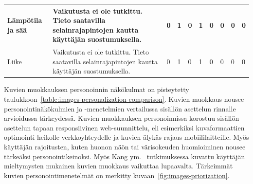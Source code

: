 \documentclass[finnish, 12pt, a4paper, elec, utf8, a-1b]{aaltothesis}
\begin{document}
{\begin{longtable}{p{2.5cm}|p{6cm}|p{0.5cm}p{0.5cm}p{0.5cm}|p{0.5cm}|p{0.5cm}p{0.5cm}p{0.5cm}|p{0.5cm}|}
    \midrule
    Lämpötila ja sää                       & Vaikutusta ei ole tutkittu. Tieto saatavilla selainrajapintojen kautta käyttäjän suostumuksella.                                                                                                                                                                                                                                                                      & 0                                          & 1                                   & 0                                      & 1                            & 0                                               & 0                                         & 0                                         & 0                            \\
    \midrule
    Liike                                  & Vaikutusta ei ole tutkittu. Tieto saatavilla selainrajapintojen kautta käyttäjän suostumuksella.                                                                                                                                                                                                                                                                      & 0                                          & 1                                   & 0                                      & 1                            & 0                                               & 0                                         & 0                                         & 0                            \\
\end{longtable}
}

Kuvien muokkauksen personoinnin näkökulmat on pisteytetty
taulukkoon~\ref{table:images-personalization-comparison}. Kuvien muokkaus nousee
personointinäkökulmien ja -menetelmien vertailussa sisällön asettelun rinnalle
arvioidussa tärkeydessä. Kuvien muokkauksen personoinnissa korostuu sisällön
asettelun tapaan responsiivinen web-suunnittelu, eli esimerkiksi kuvaformaattien
optimointi heikolle verkkoyhteydelle ja kuvien älykäs rajaus mobiililaitteille.
Myös käyttäjän rajoitusten, kuten huonon näön tai värisokeuden huomioiminen
nousee tärkeäksi personointikeinoksi. Myös Kang ym.~\cite{5539850} tutkimuksessa
kuvattu käyttäjän mieltymysten mukainen kuvien muokkaus vaikuttaa lupaavalta.
Tärkeimmät kuvien personointimenetelmät on merkitty
kuvaan~\ref{fig:images-priorization}.
\end{document}
